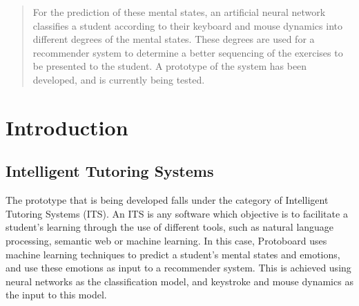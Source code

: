 \documentclass{acm_proc_article-sp}
\begin{document}
\begin{abstract}
For the prediction of these mental states, an artificial neural
network classifies a student according to their keyboard and mouse dynamics into different degrees of the mental states. 
These degrees are used 
for a recommender %
system to determine a better sequencing of the exercises to be
presented to the student. A prototype of the system has been
developed, and is currently being tested.
%  

\end{abstract}




\section{Introduction}

\subsection{Intelligent Tutoring Systems}
\label{ITSs}

The prototype that is being developed falls under the category of
Intelligent Tutoring Systems (ITS). An ITS is any software which
objective is to facilitate a student's learning through the use of
different tools, such as natural language processing, semantic web or
machine learning. In this case, Protoboard uses machine learning
techniques to predict a student's mental states and emotions, and use
these emotions as input to a recommender system. This is achieved
using neural networks as the classification model, and keystroke and
mouse dynamics as the input to this model.
\end{document}
